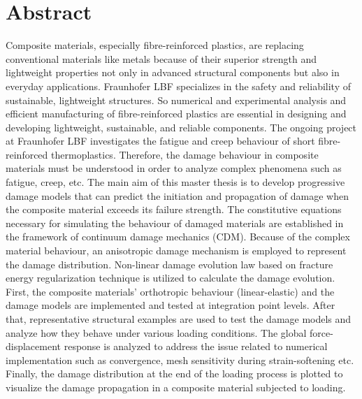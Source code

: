 \documentclass[12pt,a4paper,twoside,openright]{report}
\begin{document}


\clearpage
\thispagestyle{empty}
\hfill
\clearpage
{}
\vspace*{2cm}
\section*{\LARGE{Abstract} }
\indent\indent\indent Composite materials, especially fibre-reinforced plastics, are replacing conventional materials like metals because of their superior strength and lightweight properties not only in advanced structural components but also in everyday applications. Fraunhofer LBF specializes in the safety and reliability of sustainable, lightweight structures. So numerical and experimental analysis and efficient manufacturing of fibre-reinforced plastics are essential in designing and developing lightweight, sustainable, and reliable components. The ongoing project at Fraunhofer LBF investigates the fatigue and creep behaviour of short fibre-reinforced thermoplastics. Therefore, the damage behaviour in composite materials must be understood in order to analyze complex phenomena such as fatigue, creep, etc. The main aim of this master thesis is to develop progressive damage models that can predict the initiation and propagation of damage when the composite material exceeds its failure strength. The constitutive equations necessary for simulating the behaviour of damaged materials are established in the framework of continuum damage mechanics (CDM). Because of the complex material behaviour, an anisotropic damage mechanism is employed to represent the damage distribution. Non-linear damage evolution law based on fracture energy regularization technique is utilized to calculate the damage evolution.  First, the composite materials' orthotropic behaviour (linear-elastic) and the damage models are implemented and tested at integration point levels. After that, representative structural examples are used to test the damage models and analyze how they behave under various loading conditions. The global force-displacement response is analyzed to address the issue related to numerical implementation such as convergence, mesh sensitivity during strain-softening etc. Finally, the damage distribution at the end of the loading process is plotted to visualize the damage propagation in a composite material subjected to loading.



\clearpage
\thispagestyle{empty}
\hfill
\clearpage
\vspace*{2cm}
\end{document}

